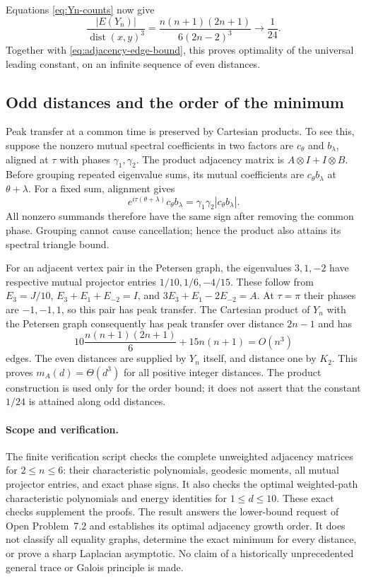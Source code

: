 \documentclass[11pt,a4paper]{article}
\theoremstyle{definition}\newtheorem{definition}[lemma]{Definition}
\theoremstyle{remark}\newtheorem{remark}[lemma]{Remark}
\begin{document}
Equations \eqref{eq:Yn-counts} now give
\[
 \frac{|E(Y_n)|}{\operatorname{dist}(x,y)^3}
  =\frac{n(n+1)(2n+1)}{6(2n-2)^3}\longrightarrow\frac1{24}.
\]
Together with \eqref{eq:adjacency-edge-bound}, this proves optimality of
the universal leading constant, on an infinite sequence of even distances.

\subsection{Odd distances and the order of the minimum}

Peak transfer at a common time is preserved by Cartesian products.
To see this, suppose the nonzero mutual spectral coefficients in two
factors are $c_\theta$ and $b_\lambda$, aligned at $\tau$ with phases
$\gamma_1,\gamma_2$. The product adjacency matrix is
$A\otimes I+I\otimes B$. Before grouping repeated eigenvalue sums, its
mutual coefficients are $c_\theta b_\lambda$ at $\theta+\lambda$.
For a fixed sum, alignment gives
\[
 e^{i\tau(\theta+\lambda)}c_\theta b_\lambda
       =\gamma_1\gamma_2|c_\theta b_\lambda|.
\]
All nonzero summands therefore have the same sign after removing the
common phase. Grouping cannot cause cancellation; hence the product
also attains its spectral triangle bound.

For an adjacent vertex pair in the Petersen graph, the eigenvalues
$3,1,-2$ have respective mutual projector entries
$1/10,1/6,-4/15$. These follow from $E_3=J/10$,
$E_3+E_1+E_{-2}=I$, and $3E_3+E_1-2E_{-2}=A$.
At $\tau=\pi$ their phases are $-1,-1,1$, so this pair has peak transfer.
The Cartesian product of $Y_n$ with the Petersen graph consequently has
peak transfer over distance $2n-1$ and has
\[
 10\frac{n(n+1)(2n+1)}6+15n(n+1)=O(n^3)
\]
edges. The even distances are supplied by $Y_n$ itself, and distance one
by $K_2$. This proves $m_A(d)=\Theta(d^3)$ for all positive integer
distances. The product construction is used only for the order bound;
it does not assert that the constant $1/24$ is attained along odd distances.

\paragraph{Scope and verification.}
The finite verification script checks the complete unweighted adjacency
matrices for $2\leq n\leq6$: their characteristic polynomials, geodesic
moments, all mutual projector entries, and exact phase signs. It also
checks the optimal weighted-path characteristic polynomials and energy
identities for $1\leq d\leq10$. These exact checks supplement the proofs.
The result answers the lower-bound request of Open Problem~7.2 and
establishes its optimal adjacency growth order. It does not classify
all equality graphs, determine the exact minimum for every distance,
or prove a sharp Laplacian asymptotic. No claim of a historically
unprecedented general trace or Galois principle is made.
\end{document}
